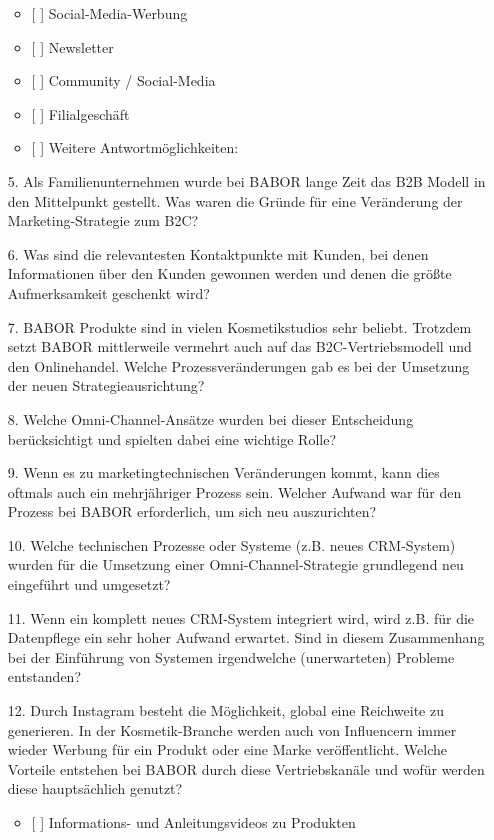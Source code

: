 \begin{enumerate}
\begin{itemize}
               \item{[ ] Social-Media-Werbung}
               \item{[ ] Newsletter}
               \item{[ ] Community / Social-Media}
               \item{[ ] Filialgeschäft}
               \item{[ ] Weitere Antwortmöglichkeiten:  }
             \end{itemize}
 \item[5.] Als Familienunternehmen wurde bei BABOR lange Zeit das B2B Modell in den Mittelpunkt gestellt. Was waren die Gründe für eine Veränderung der Marketing-Strategie zum B2C?
 \item[6.] Was sind die relevantesten Kontaktpunkte mit Kunden, bei denen Informationen über den Kunden gewonnen werden und denen die größte Aufmerksamkeit geschenkt wird?
 \item[7.] BABOR Produkte sind in vielen Kosmetikstudios sehr beliebt. Trotzdem setzt BABOR mittlerweile vermehrt auch auf das B2C-Vertriebsmodell und den Onlinehandel. Welche Prozessveränderungen gab es bei der Umsetzung der neuen Strategieausrichtung?
 \item[8.] Welche Omni-Channel-Ansätze wurden bei dieser Entscheidung berücksichtigt und spielten dabei eine wichtige Rolle?
 \item[9.] Wenn es zu marketingtechnischen Veränderungen kommt, kann dies oftmals auch ein mehrjähriger Prozess sein. Welcher Aufwand war für den Prozess bei BABOR erforderlich, um sich neu auszurichten?
 \item[10.] Welche technischen Prozesse oder Systeme (z.B. neues CRM-System) wurden für die Umsetzung einer Omni-Channel-Strategie grundlegend neu eingeführt und umgesetzt?
 \item[11.] Wenn ein komplett neues CRM-System integriert wird, wird z.B. für die Datenpflege ein sehr hoher Aufwand erwartet. Sind in diesem Zusammenhang bei der Einführung von Systemen irgendwelche (unerwarteten) Probleme entstanden?
 \item[12.] Durch Instagram besteht die Möglichkeit, global eine Reichweite zu generieren. In der Kosmetik-Branche werden auch von Influencern immer wieder Werbung für ein Produkt oder eine Marke veröffentlicht. Welche Vorteile entstehen bei BABOR durch diese Vertriebskanäle und wofür werden diese hauptsächlich genutzt?
    \begin{itemize}
               \item{[ ] Informations- und Anleitungsvideos zu Produkten}

\end{itemize}
\end{enumerate}
